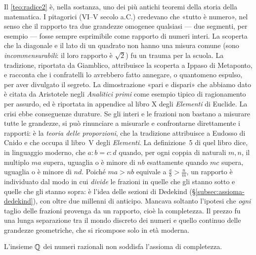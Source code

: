 \begin{notastorica}
Il \cref{teo:radice2} è, nella sostanza, uno dei più antichi teoremi della storia
della matematica. I pitagorici (VI--V secolo a.C.) credevano che «tutto è numero», nel
senso che il rapporto tra due grandezze omogenee qualsiasi --- due segmenti, per esempio
--- fosse sempre esprimibile come rapporto di numeri interi. La scoperta che la diagonale
e il lato di un quadrato non hanno una misura comune (sono \emph{incommensurabili}: il
loro rapporto è $\sqrt2$) fu un trauma per la scuola. La tradizione, riportata da
Giamblico, attribuisce la scoperta a Ippaso di Metaponto, e racconta che i confratelli lo
avrebbero fatto annegare, o quantomeno espulso, per aver divulgato il segreto. La
dimostrazione «pari e dispari» che abbiamo dato è citata da Aristotele negli
\emph{Analitici primi} come esempio tipico di ragionamento per assurdo, ed è riportata in
appendice al libro X degli \emph{Elementi} di Euclide.
La crisi ebbe conseguenze durature. Se gli interi e le frazioni non bastano a misurare
tutte le grandezze, si può rinunciare a misurarle e confrontarne direttamente i
rapporti: è la \emph{teoria delle proporzioni}, che la tradizione attribuisce a Eudosso
di Cnido e che occupa il libro~V degli \emph{Elementi}. La definizione~5 di quel libro
dice, in linguaggio moderno, che $a:b=c:d$ quando, per ogni coppia di naturali $m,n$,
il multiplo $ma$ supera, uguaglia o è minore di $nb$ esattamente quando $mc$ supera,
uguaglia o è minore di $nd$. Poiché $ma>nb$ equivale a $\frac ab>\frac nm$, un rapporto è
individuato dal modo in cui \emph{divide} le frazioni in quelle che gli stanno sotto e
quelle che gli stanno sopra: è l'idea delle sezioni di Dedekind
(\S\ref{subsec:assioma-dedekind}), con oltre due millenni di anticipo. Mancava soltanto
l'ipotesi che \emph{ogni} taglio delle frazioni provenga da un rapporto, cioè la
completezza. Il prezzo fu una lunga separazione tra il mondo discreto dei numeri e quello
continuo delle grandezze geometriche, che si ricompose solo in età moderna.
\end{notastorica}

\begin{teorema}\label{teo:Q-non-completo}
L'insieme $\mathbb{Q}$ dei numeri razionali non soddisfa l'assioma di completezza.
\end{teorema}

\begin{schema}
\end{schema}

